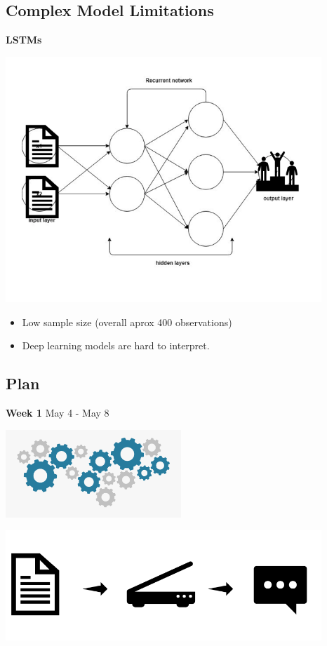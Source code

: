 \documentclass[
]{article}
\providecommand{\tightlist}{%
  \setlength{\itemsep}{0pt}\setlength{\parskip}{0pt}}
\begin{document}
\hypertarget{complex-model-limitations}{%
\subsection{Complex Model Limitations}\label{complex-model-limitations}}

\textbf{LSTMs}

\includegraphics[width=4.6875in,height=\textheight]{../img/project_proposal/08_LSTM.png}

\begin{itemize}
\tightlist
\item
  Low sample size (overall aprox 400 observations)
\item
  Deep learning models are hard to interpret.
\end{itemize}

\hypertarget{plan}{%
\subsection{Plan}\label{plan}}

\textbf{Week 1} May 4 - May 8

\includegraphics[width=2.60417in,height=\textheight]{../img/project_proposal/28_process.png}

\includegraphics[width=4.6875in,height=\textheight]{../img/project_proposal/15_week1.png}
\end{document}
